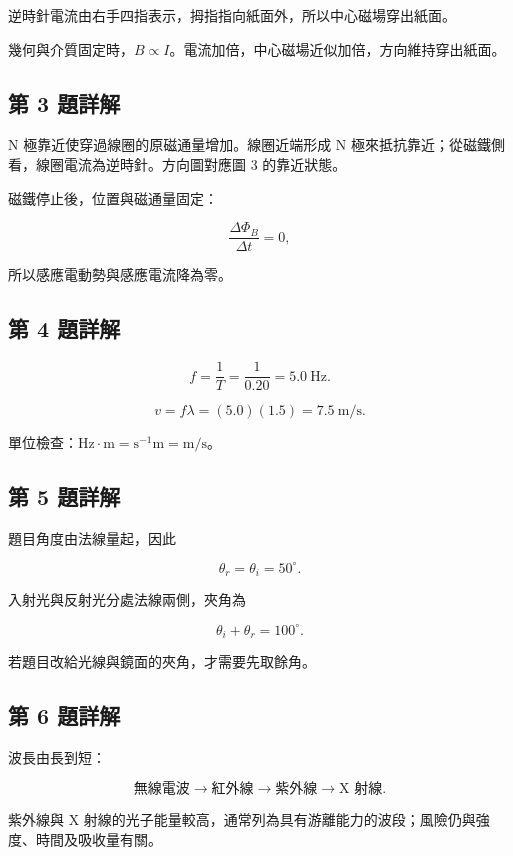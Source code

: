 \documentclass[11pt,a4paper]{article}
\begin{document}
逆時針電流由右手四指表示，拇指指向紙面外，所以中心磁場穿出紙面。

幾何與介質固定時，\(B\propto I\)。電流加倍，中心磁場近似加倍，方向維持穿出紙面。

\subsection{第 3 題詳解}\label{ux7b2c-3-ux984cux8a73ux89e3}

N 極靠近使穿過線圈的原磁通量增加。線圈近端形成 N 極來抵抗靠近；從磁鐵側看，線圈電流為逆時針。方向圖對應圖 3 的靠近狀態。

磁鐵停止後，位置與磁通量固定：

\[
\frac{\Delta\Phi_B}{\Delta t}=0,
\]

所以感應電動勢與感應電流降為零。

\subsection{第 4 題詳解}\label{ux7b2c-4-ux984cux8a73ux89e3}

\[
f=\frac1T=\frac1{0.20}=5.0\ \mathrm{Hz}.
\]

\[
v=f\lambda=(5.0)(1.5)=7.5\ \mathrm{m/s}.
\]

單位檢查：\(\mathrm{Hz\cdot m}=\mathrm{s^{-1}m}=\mathrm{m/s}\)。

\subsection{第 5 題詳解}\label{ux7b2c-5-ux984cux8a73ux89e3}

題目角度由法線量起，因此

\[
\theta_r=\theta_i=50^\circ.
\]

入射光與反射光分處法線兩側，夾角為

\[
\theta_i+\theta_r=100^\circ.
\]

若題目改給光線與鏡面的夾角，才需要先取餘角。

\subsection{第 6 題詳解}\label{ux7b2c-6-ux984cux8a73ux89e3}

波長由長到短：

\[
\text{無線電波}\rightarrow\text{紅外線}
\rightarrow\text{紫外線}\rightarrow\text{X 射線}.
\]

紫外線與 X 射線的光子能量較高，通常列為具有游離能力的波段；風險仍與強度、時間及吸收量有關。
\end{document}
